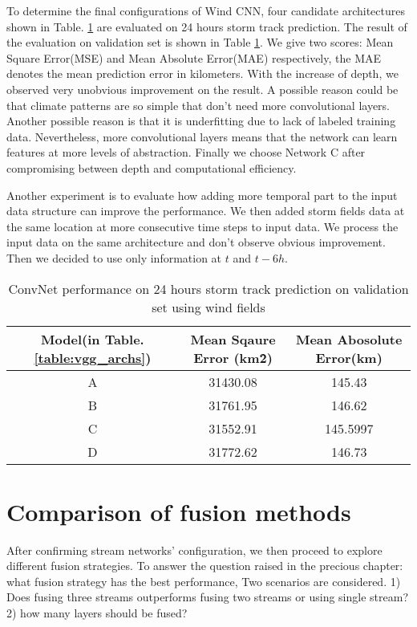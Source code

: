 To determine the final configurations of Wind CNN, four candidate architectures shown in Table. \ref{table:arch_evaluation} are evaluated on 24 hours storm track prediction. The result of the evaluation on validation set is shown in Table \ref{table:arch_evaluation}. We give two scores: Mean Square Error(MSE) and Mean Absolute Error(MAE) respectively, the MAE denotes the mean prediction error in kilometers. With the increase of depth, we observed very unobvious improvement on the result. A possible reason could be that climate patterns are so simple that don't need more convolutional layers. Another possible reason is that it is underfitting due to lack of labeled training data. Nevertheless, more convolutional layers means that the network can learn features at more levels of abstraction. Finally we choose Network C after compromising between depth and computational efficiency.

Another experiment is to evaluate how adding more temporal part to the input data structure can improve the performance. We then added storm fields data at the same location at more consecutive time steps to input data. We process the input data on the same architecture and don't observe obvious improvement. Then we decided to use only information at $t$ and $t-6h$. 

\begin{table}[]
	\centering
	\caption{ConvNet performance on 24 hours storm track prediction on validation set using wind fields}
	\label{table:arch_evaluation}
	\begin{tabular}{|c|c|c|}
		\hline
		Model(in Table. \ref{table:vgg_archs}) & Mean Sqaure Error (km\^2) & Mean Abosolute Error(km) \\ \hline
		A & 31430.08 & 145.43  \\ \hline
		B & 31761.95 & 146.62  \\ \hline
		C & 31552.91 & 145.5997 \\ \hline
		D & 31772.62 & 146.73 \\ \hline
		
	
	\end{tabular}
\end{table}

\section{Comparison of fusion methods}
After confirming stream networks' configuration, we then proceed to explore different fusion strategies. To answer the question raised in the precious chapter: what fusion strategy has the best performance, Two scenarios are considered. 1) Does fusing three streams outperforms fusing two streams or using single stream? 2) how many layers should be fused? 

